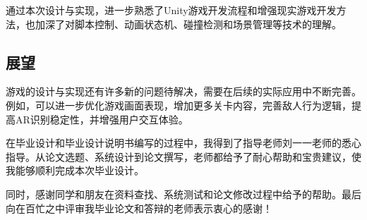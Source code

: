 \documentclass[12pt]{graduate-design-manual}
\begin{document}
通过本次设计与实现，进一步熟悉了Unity游戏开发流程和增强现实游戏开发方法，也加深了对脚本控制、动画状态机、碰撞检测和场景管理等技术的理解。

\subsection{展望}
游戏的设计与实现还有许多新的问题待解决，需要在后续的实际应用中不断完善。例如，可以进一步优化游戏画面表现，增加更多关卡内容，完善敌人行为逻辑，提高AR识别稳定性，并增强用户交互体验。

\begin{acknowledgement}
在毕业设计和毕业设计说明书编写的过程中，我得到了指导老师刘一一老师的悉心指导。从论文选题、系统设计到论文撰写，老师都给予了耐心帮助和宝贵建议，使我能够顺利完成本次毕业设计。

同时，感谢同学和朋友在资料查找、系统测试和论文修改过程中给予的帮助。最后向在百忙之中评审我毕业论文和答辩的老师表示衷心的感谢！
\end{acknowledgement}
\nocite{*} %


\begin{appendixsection}
\end{appendixsection}
\end{document}
